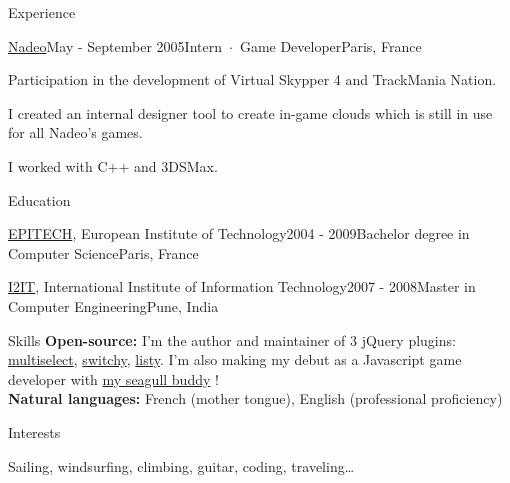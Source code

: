 \documentclass{resume} %
\begin{document}
\begin{rSection}{Experience}
\begin{rSubsection}{\href{http://nadeo.com}{Nadeo}}{May - September 2005}{Intern~$\cdot$~Game Developer}{Paris, France}
\item Participation in the development of Virtual Skypper 4 and TrackMania Nation.
\item I created an internal designer tool to create in-game clouds which is still in use for all Nadeo's games.
\item I worked with C++ and 3DSMax.
\end{rSubsection}


\end{rSection}

\begin{rSection}{Education}

\begin{rSubsection}{\href{http://epitech.com}{EPITECH}, European Institute of Technology}{2004 - 2009}{Bachelor degree in Computer Science}{Paris, France}
\item
\end{rSubsection}
\begin{rSubsection}{\href{http://www.isquareit.ac.in/}{I2IT}, International Institute of Information Technology}{2007 - 2008}{Master in Computer Engineering}{Pune, India}
\item
\end{rSubsection}


\end{rSection}

\begin{rSection}{Skills}
\textbf{Open-source:}
I'm the author and maintainer of 3 jQuery plugins: \href{http://loudev.com}{multiselect}, \href{https://github.com/lou/switchy}{switchy}, \href{https://github.com/lou/listy}{listy}.
I'm also making my debut as a Javascript game developer with \href{http://lou.github.io/seagull/}{my seagull buddy} !\\

\textbf{Natural languages:}
French (mother tongue), English (professional proficiency)

\end{rSection}


\begin{rSection}{Interests}

Sailing, windsurfing, climbing, guitar, coding, traveling\ldots

\end{rSection}

\end{document}
